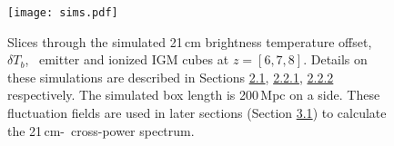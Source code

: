 \begin{figure}[p]
	\centering
	\texttt{[image: sims.pdf]}
	\caption[Simulated 21cm and \lya\ emission]{Slices through the simulated 21\,cm brightness temperature offset, $\delta T_b$, \lya\ emitter and ionized IGM cubes at $z = \left[6, 7, 8\right]$. Details on these simulations are described in Sections \hyperref[sec:21cm_temp]{2.1}, \hyperref[ref:laes]{2.2.1}, \hyperref[sec:ionized_igm]{2.2.2} respectively. The simulated box length is 200\,Mpc on a side. These fluctuation fields are used in later sections (Section \hyperref[sec:cross-power]{3.1}) to calculate the 21\,cm-\lya\ cross-power spectrum.}
	\label{fig:sims}
\end{figure}
